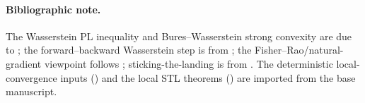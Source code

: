 \paragraph{Bibliographic note.}
The Wasserstein PL inequality and Bures--Wasserstein strong convexity are due to
\cite{lambert2022variational}; the forward--backward Wasserstein step is from
\cite{diao2023forward}; the Fisher--Rao/natural-gradient viewpoint follows
\cite{chen2023sampling}; sticking-the-landing is from \cite{roeder2017sticking}. The
deterministic local-convergence inputs () and the local STL
theorems () are imported from the base manuscript.
